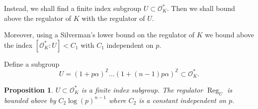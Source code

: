 \documentclass[a4paper]{article}
\newcommand{\red}{\textcolor{red}} %
\newtheorem{Prop}[Thm]{Proposition}
\renewcommand{\O}{\mathcal{O}}        %
\DeclareMathOperator{\Reg}{Reg}        %
\begin{document}
Instead, we shall find a finite index subgroup $U \subset \O_K^*$. 
Then we shall bound above the regulator of $K$ with the regulator of $U$.

Moreover, using a Silverman's lower bound on the regulator of $K$ we bound above the index $[\O_K^*: U] < C_1$ with $C_1$ independent on $p$.


Define a subgroup 
\[
	U = (1 + p \alpha)^{\mathbb{Z}} \ldots (1 + (n-1) p \alpha)^{\mathbb{Z}} \subset \O_K^*
.\] 
\begin{Prop}
$U \subset \O_K^*$ is a finite index subgroup.
The regulator $\Reg_U$ is bounded above by $C_2 \log(p)^{n-1}$ where $C_2$ is a constant independent on $p$.
\end{Prop}
\end{document}
